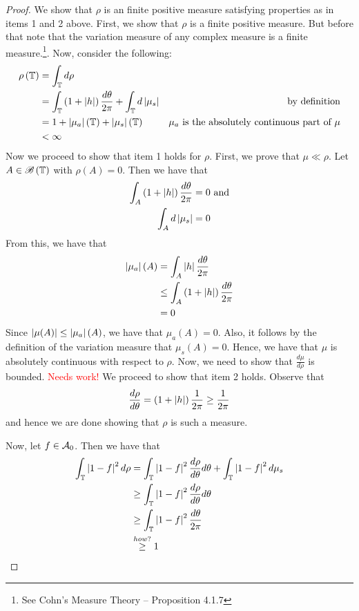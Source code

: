 \begin{proof}
   We show that $\rho$ is an finite positive measure satisfying properties as in items 1 and 2 above. First, we show that $\rho$ is a finite positive measure. But before that note that the variation measure of any complex measure is  a finite measure.\footnote{See Cohn's Measure Theory -- Proposition 4.1.7}. Now, consider the following:
   \begin{align*}
       \rho\left( \mathbb T \right) &= \int_{\mathbb T} d\rho \\
       &= \int_{\mathbb T} \left( 1+ \left\lvert h \right\rvert \right) \frac{d\theta}{2\pi} + \int_{\mathbb T} d\left\lvert \mu_{s} \right\rvert  & \text{by definition} \\
       &= 1 + \left\lvert \mu_{a} \right\rvert \left( \mathbb T \right) + \left\lvert \mu_{s} \right\rvert \left( \mathbb T \right) & \mu_{a} \text{ is the absolutely continuous part of } \mu \\
       &< \infty
   \end{align*}
   Now we proceed to show that item 1 holds for $\rho$. First, we prove that $\mu \ll \rho$. Let $A \in {\mathscr B} \left( \mathbb T \right)$ with $\rho \left( A \right) = 0$. Then we have that
   \begin{align*}
       \int_{A} \left( 1+ \left\lvert h \right\rvert \right) \frac{d\theta}{2\pi} &=0 \text{ and} \\
       \int_{A} d\left\lvert \mu_{s} \right\rvert &= 0
   \end{align*}
   From this, we have that
   \begin{align*}
       \left\lvert \mu_{a} \right\rvert \left( A \right) &=  \int_{A} \left\lvert h \right\rvert \frac{d\theta}{2\pi} \\
       &\le \int_{A} \left( 1+\left\lvert h \right\rvert  \right)\frac{d\theta}{2\pi} \\
       &= 0
   \end{align*}
   Since $\left\lvert \mu (A) \right\rvert \le \left\lvert \mu_{a} \right\rvert (A)$, we have that $\mu_{a} \left( A \right) = 0$. Also, it follows by the definition of the variation measure that $\mu_s \left( A \right) = 0$. Hence, we have that $\mu $ is absolutely continuous with respect to $\rho$. Now, we need to show that $\frac{d\mu}{d\rho}$ is bounded. \textcolor{red}{Needs work!}
We proceed to show that item 2 holds. Observe that
\begin{align*}
    \frac{d\rho}{d\theta} = \left( 1+\left\lvert h \right\rvert \right) \frac{1}{2\pi} \ge \frac{1}{2\pi}
\end{align*}
and hence we are done showing that $\rho$ is such a measure.

Now, let $f\in {\cal A}_{0}$. Then we have that
\begin{align*}
    \int_{\mathbb T} \left\lvert 1-f \right\rvert^{2} d\rho &= \int_{\mathbb T} \left\lvert 1-f \right\rvert^{2} \frac{d\rho}{d\theta} d\theta + \int_{\mathbb T} \left\lvert 1-f \right\rvert^2 d\mu_{s} \\
    &\ge \int_{\mathbb T} \left\lvert 1-f \right\rvert^{2} \frac{d\rho}{d\theta} d\theta \\
    & \ge \int_{\mathbb T} \left\lvert 1-f \right\rvert^{2} \frac{d\theta}{2\pi} \\ 
    & \stackrel{how?}{\ge} 1
\end{align*}


\end{proof}
